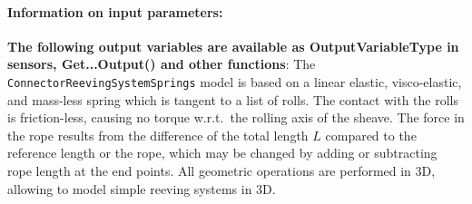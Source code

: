 \paragraph{Information on input parameters:} 
\finishTable
{\bf The following output variables are available as OutputVariableType in sensors, Get...Output() and other functions}: 
\finishTable
 \noindent
    The \texttt{ConnectorReevingSystemSprings} model is based on a linear elastic, visco-elastic, and mass-less spring which
    is tangent to a list of rolls. The contact with the rolls is friction-less, causing no torque w.r.t.\ the rolling axis of the sheave.
    The force in the rope results from the difference of the total length $L$ compared to the reference length or the rope, which 
    may be changed by adding or subtracting rope length at the end points. All geometric operations are performed in 3D, allowing to model
    simple reeving systems in 3D.
    
